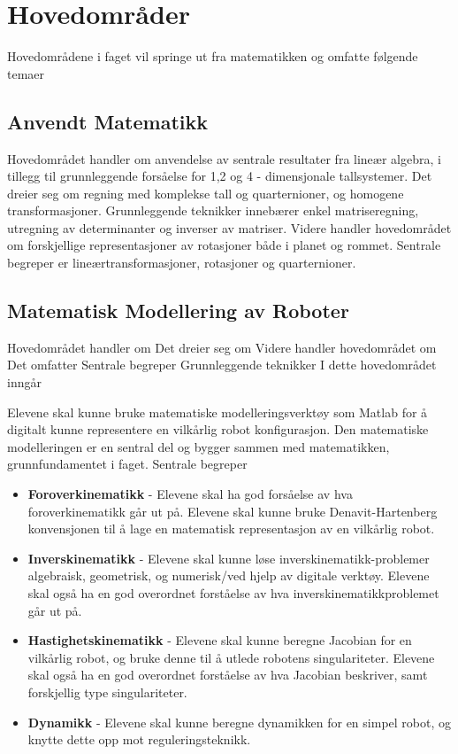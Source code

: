 \section*{Hovedområder} \label{Sec: Hovedomraader}

Hovedområdene i faget vil springe ut fra matematikken og omfatte følgende temaer


\subsection*{Anvendt Matematikk}

    Hovedområdet handler om anvendelse av sentrale resultater fra lineær algebra, i tillegg til grunnleggende forsåelse for 1,2 og 4 - dimensjonale tallsystemer. Det dreier seg om regning med komplekse tall og quarternioner, og homogene transformasjoner. Grunnleggende teknikker innebærer enkel matriseregning, utregning av determinanter og inverser av matriser. Videre handler hovedområdet om forskjellige representasjoner av rotasjoner både i planet og rommet. Sentrale begreper er lineærtransformasjoner, rotasjoner og quarternioner.


\subsection*{Matematisk Modellering av Roboter}

    Hovedområdet handler om
    Det dreier seg om
    Videre handler hovedområdet om
    Det omfatter
    Sentrale begreper
    Grunnleggende teknikker
    I dette hovedområdet inngår

    Elevene skal kunne bruke matematiske modelleringsverktøy som Matlab for å digitalt kunne representere en vilkårlig robot konfigurasjon. Den matematiske modelleringen er en sentral del og bygger sammen med matematikken, grunnfundamentet i faget.  Sentrale begreper

    \begin{itemize}
        \item \textbf{Foroverkinematikk} - Elevene skal ha god forsåelse av hva foroverkinematikk går ut på. Elevene skal kunne bruke Denavit-Hartenberg konvensjonen til å lage en matematisk representasjon av en vilkårlig robot.
        \item \textbf{Inverskinematikk} - Elevene skal kunne løse inverskinematikk-problemer algebraisk, geometrisk, og numerisk/ved hjelp av digitale verktøy. Elevene skal også ha en god overordnet forståelse av hva inverskinematikkproblemet går ut på.
        \item \textbf{Hastighetskinematikk} - Elevene skal kunne beregne Jacobian for en vilkårlig robot, og bruke denne til å utlede robotens singulariteter. Elevene skal også ha en god overordnet forståelse av hva Jacobian beskriver, samt forskjellig type singulariteter.
        \item \textbf{Dynamikk} - Elevene skal kunne beregne dynamikken for en simpel robot, og knytte dette opp mot reguleringsteknikk.
    \end{itemize}

